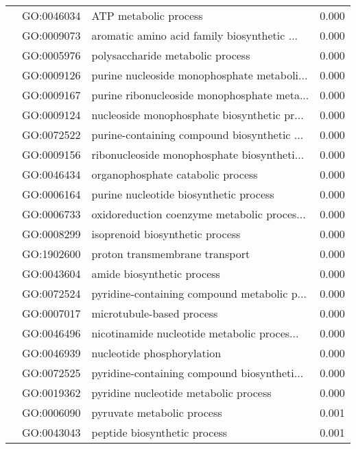 \begin{longtable}{lllr}
   & GO:0046034 &                        ATP metabolic process &         0.000 \\
   & GO:0009073 &  aromatic amino acid family biosynthetic ... &         0.000 \\
   & GO:0005976 &             polysaccharide metabolic process &         0.000 \\
   & GO:0009126 &  purine nucleoside monophosphate metaboli... &         0.000 \\
   & GO:0009167 &  purine ribonucleoside monophosphate meta... &         0.000 \\
   & GO:0009124 &  nucleoside monophosphate biosynthetic pr... &         0.000 \\
   & GO:0072522 &  purine-containing compound biosynthetic ... &         0.000 \\
   & GO:0009156 &  ribonucleoside monophosphate biosyntheti... &         0.000 \\
   & GO:0046434 &            organophosphate catabolic process &         0.000 \\
   & GO:0006164 &       purine nucleotide biosynthetic process &         0.000 \\
   & GO:0006733 &  oxidoreduction coenzyme metabolic proces... &         0.000 \\
   & GO:0008299 &              isoprenoid biosynthetic process &         0.000 \\
   & GO:1902600 &               proton transmembrane transport &         0.000 \\
   & GO:0043604 &                   amide biosynthetic process &         0.000 \\
   & GO:0072524 &  pyridine-containing compound metabolic p... &         0.000 \\
   & GO:0007017 &                    microtubule-based process &         0.000 \\
   & GO:0046496 &  nicotinamide nucleotide metabolic proces... &         0.000 \\
   & GO:0046939 &                   nucleotide phosphorylation &         0.000 \\
   & GO:0072525 &  pyridine-containing compound biosyntheti... &         0.000 \\
   & GO:0019362 &        pyridine nucleotide metabolic process &         0.000 \\
   & GO:0006090 &                   pyruvate metabolic process &         0.001 \\
   & GO:0043043 &                 peptide biosynthetic process &         0.001 \\

\end{longtable}

